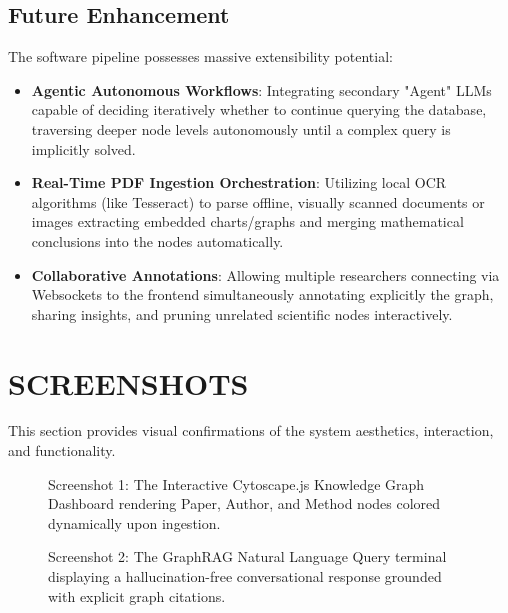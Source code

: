 \documentclass[12pt,a4paper]{report}
\begin{document}
\section{Future Enhancement}
The software pipeline possesses massive extensibility potential:
\begin{itemize}
    \item \textbf{Agentic Autonomous Workflows}: Integrating secondary "Agent" LLMs capable of deciding iteratively whether to continue querying the database, traversing deeper node levels autonomously until a complex query is implicitly solved.
    \item \textbf{Real-Time PDF Ingestion Orchestration}: Utilizing local OCR algorithms (like Tesseract) to parse offline, visually scanned documents or images extracting embedded charts/graphs and merging mathematical conclusions into the nodes automatically.
    \item \textbf{Collaborative Annotations}: Allowing multiple researchers connecting via Websockets to the frontend simultaneously annotating explicitly the graph, sharing insights, and pruning unrelated scientific nodes interactively.
\end{itemize}

\chapter{SCREENSHOTS}
\noindent{\rule{\textwidth}{1.5pt}}

This section provides visual confirmations of the system aesthetics, interaction, and functionality.

\vspace{1.5cm}

\begin{figure}[htbp]
\centering
\vspace{7cm} 
\caption{Screenshot 1: The Interactive Cytoscape.js Knowledge Graph Dashboard rendering Paper, Author, and Method nodes colored dynamically upon ingestion.}
\label{fig:screen1}
\end{figure}

\vspace{2cm}

\begin{figure}[htbp]
\centering
\vspace{7cm}
\caption{Screenshot 2: The GraphRAG Natural Language Query terminal displaying a hallucination-free conversational response grounded with explicit graph citations.}
\label{fig:screen2}
\end{figure}
\end{document}
